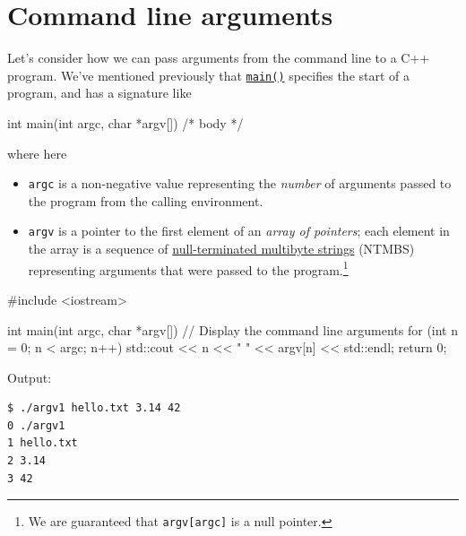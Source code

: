 \documentclass[12pt,letterpaper,twoside]{article}
\begin{document}
\section{Command line arguments}
Let's consider how we can pass arguments from the command line to a C++ program. 
We've mentioned previously that 
\href{https://en.cppreference.com/w/cpp/language/main_function}{\texttt{main()}} 
specifies the start of a program, and
has a signature like
\begin{cpp}
int main(int argc, char *argv[]) { /* body */ }
\end{cpp}
where here
\begin{itemize}   \item \texttt{argc} is a non-negative value representing the \emph{number} of arguments 
    passed to the program from the calling environment.
  \item \texttt{argv} is a pointer to the first element of an \emph{array of pointers}; 
    each element in the array is a sequence of 
    \href{https://en.cppreference.com/w/cpp/string/multibyte}
    {null-terminated multibyte strings} (NTMBS) 
    representing arguments that were passed to the 
    program.\footnote{We are guaranteed that \texttt{argv[argc]} is a null pointer.} \end{itemize}

\begin{cpp}
#include <iostream>

int main(int argc, char *argv[]) {
  // Display the command line arguments
  for (int n = 0; n < argc; n++) {
    std::cout << n << " " << argv[n] << std::endl;
  }
  return 0;
}
\end{cpp}

Output:

{\small
\begin{verbatim}
$ ./argv1 hello.txt 3.14 42
0 ./argv1
1 hello.txt
2 3.14
3 42
\end{verbatim}
}
\end{document}
